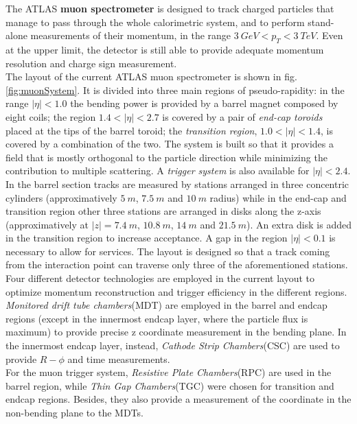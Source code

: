 \documentclass[a4paper,twoside,12pt]{article}
\begin{document}
The ATLAS \textbf{muon spectrometer} is designed to track charged particles that manage to pass through the whole calorimetric system, and to perform stand-alone measurements of their momentum, in the range 
$3\ GeV < p_{T} < 3\ TeV$. Even at the upper limit, the detector is still able to provide adequate momentum resolution and charge sign measurement.\\

The layout of the current  ATLAS muon spectrometer is shown in fig. \ref{fig:muonSystem}. It is divided into three main regions of pseudo-rapidity: in the range $|\eta| < 1.0$ the bending power
is provided by a barrel magnet composed by eight coils; the region $1.4 < |\eta| < 2.7$ is covered by a pair of \textit{end-cap toroids} placed at the tips of the barrel toroid; the \textit{transition
region}, $1.0 < |\eta| < 1.4$, is covered by a combination of the two. The system is built so that it provides a field that is mostly orthogonal to the particle direction while minimizing the contribution to multiple scattering. A \textit{trigger system} is also available for $|\eta| < 2.4$. \\

In the barrel section tracks are measured by stations arranged in three concentric cylinders (approximatively $5\ m$, $7.5\ m$ and $10\ m$ radius) while in the end-cap and
transition region other three stations are arranged in disks along the z-axis (approximatively at  $|z| = 7.4\ m$, $10.8\ m$, $14\ m$ and $21.5\ m$). An extra disk is added in the transition
region to increase acceptance. A gap in the region $|\eta| < 0.1$ is necessary to allow for services. The layout is designed so that a track coming from the interaction point can traverse only three of the aforementioned stations.\\

Four different detector technologies are employed in the current layout to optimize momentum reconstruction and trigger efficiency in the 
different regions.  \textit{Monitored drift tube chambers}(MDT) are employed in the barrel and endcap regions (except in the innermost endcap layer, where the particle flux is maximum) to provide precise z coordinate measurement in the bending plane. In the innermost endcap layer, instead, \textit{Cathode Strip Chambers}(CSC) are used to provide $R-\phi$ and time measurements. \\

For the muon trigger system, \textit{Resistive Plate Chambers}(RPC) are used in the barrel region, while \textit{Thin Gap Chambers}(TGC) were chosen for transition and endcap regions. Besides, they also provide a measurement of the coordinate in the non-bending plane to the MDTs. 
\end{document}
